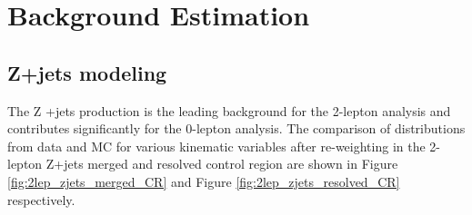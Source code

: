 \chapter{Background Estimation}

\section{Z+jets modeling}

The Z +jets production is the leading background for the 2-lepton analysis and contributes significantly for the 0-lepton analysis. The comparison of distributions from data and MC for various kinematic variables after re-weighting in the 2-lepton Z+jets merged and resolved control region are shown in Figure \ref{fig:2lep_zjets_merged_CR} and Figure \ref{fig:2lep_zjets_resolved_CR} respectively.




